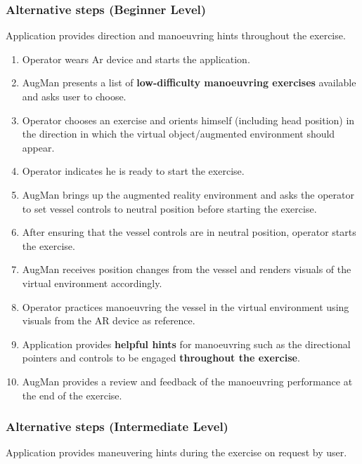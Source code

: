 \subsubsection{Alternative steps (Beginner Level)}

Application provides direction and manoeuvring hints throughout the exercise.

\begin{enumerate}[noitemsep]
	\item Operator wears Ar device and starts the application. 
	\item AugMan presents a list of \textbf{low-difficulty manoeuvring exercises} available and asks user to choose.
	\item Operator chooses an exercise and orients himself (including head position) in the direction in which the virtual object/augmented environment should appear.
	\item Operator indicates he is ready to start the exercise.
	\item AugMan brings up the augmented reality environment and asks the operator to set vessel controls to neutral position before starting the exercise.
	\item After ensuring that the vessel controls are in neutral position, operator starts the exercise. 
	\item AugMan receives position changes from the vessel and renders visuals of the virtual environment accordingly.
	\item Operator practices manoeuvring the vessel in the virtual environment using visuals from the AR device as reference.
	\item Application provides \textbf{helpful hints} for manoeuvring such as the directional pointers and controls to be engaged \textbf{throughout the exercise}.
	\item AugMan provides a review and feedback of the manoeuvring performance at the end of the exercise.
\end{enumerate}

\subsubsection{Alternative steps (Intermediate Level)}

Application provides maneuvering hints during the exercise on request by user.

